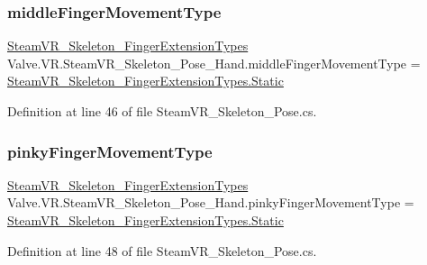 \subsubsection{\texorpdfstring{middleFingerMovementType}{middleFingerMovementType}}
{\footnotesize\ttfamily \mbox{\hyperlink{namespace_valve_1_1_v_r_af4f7ce87893374f71b2fa2ba112642da}{Steam\+V\+R\+\_\+\+Skeleton\+\_\+\+Finger\+Extension\+Types}} Valve.\+V\+R.\+Steam\+V\+R\+\_\+\+Skeleton\+\_\+\+Pose\+\_\+\+Hand.\+middle\+Finger\+Movement\+Type = \mbox{\hyperlink{namespace_valve_1_1_v_r_af4f7ce87893374f71b2fa2ba112642daa84a8921b25f505d0d2077aeb5db4bc16}{Steam\+V\+R\+\_\+\+Skeleton\+\_\+\+Finger\+Extension\+Types.\+Static}}}



Definition at line 46 of file Steam\+V\+R\+\_\+\+Skeleton\+\_\+\+Pose.\+cs.

\mbox{\label{class_valve_1_1_v_r_1_1_steam_v_r___skeleton___pose___hand_aa2693526977ec3902da52cd4af6f269b}} 
\subsubsection{\texorpdfstring{pinkyFingerMovementType}{pinkyFingerMovementType}}
{\footnotesize\ttfamily \mbox{\hyperlink{namespace_valve_1_1_v_r_af4f7ce87893374f71b2fa2ba112642da}{Steam\+V\+R\+\_\+\+Skeleton\+\_\+\+Finger\+Extension\+Types}} Valve.\+V\+R.\+Steam\+V\+R\+\_\+\+Skeleton\+\_\+\+Pose\+\_\+\+Hand.\+pinky\+Finger\+Movement\+Type = \mbox{\hyperlink{namespace_valve_1_1_v_r_af4f7ce87893374f71b2fa2ba112642daa84a8921b25f505d0d2077aeb5db4bc16}{Steam\+V\+R\+\_\+\+Skeleton\+\_\+\+Finger\+Extension\+Types.\+Static}}}



Definition at line 48 of file Steam\+V\+R\+\_\+\+Skeleton\+\_\+\+Pose.\+cs.

\mbox{\label{class_valve_1_1_v_r_1_1_steam_v_r___skeleton___pose___hand_a1621152dc8469b2e9ba09535f2c0ad28}} 
